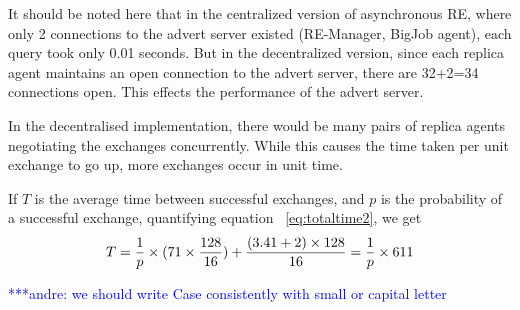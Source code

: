 \documentclass{rspublic}
\newcommand{\jhanote}[1]{ {\textcolor{red} { ***shantenu: #1 }}}
\newcommand{\alnote}[1]{ {\textcolor{blue} { ***andre: #1 }}}
\newcommand{\alnote}[1]{}
\newcommand{\jhanote}[1]{}
\begin{document}
It should be noted here that in the centralized version of
asynchronous RE, where only 2 connections to the advert server existed
(RE-Manager, BigJob agent), each query took only 0.01 seconds. But in
the decentralized version, since each replica agent maintains an open
connection to the advert server, there are 32+2=34 connections
open. This effects the performance of the advert server.

In the decentralised implementation, there
would be many pairs of replica agents negotiating the exchanges concurrently. While this causes the time taken per unit
exchange to go up, more exchanges occur in unit time. 


If $T$ is the average time between successful exchanges, and $p$ is
the probability of a successful exchange, quantifying equation
~\ref{eq:totaltime2}, we get
\begin{eqnarray}
T=  {1 \over p} \times {{(71\times {128\over 16}}) + {(3.41+2)\times 128\over 16}} = {1 \over p} \times 611
\label{eq:decent}
\end{eqnarray}




\alnote{we should write Case consistently with small or capital letter}
\end{document}
